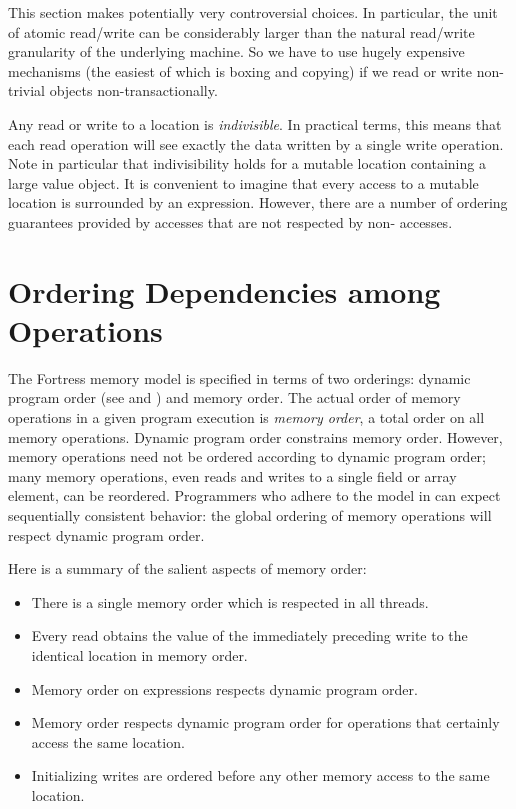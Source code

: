 This section makes potentially very controversial choices.  In
particular, the unit of atomic read/write can be considerably larger
than the natural read/write granularity of the underlying machine.
So we have to use hugely expensive mechanisms (the easiest of which
is boxing and copying) if we read or write non-trivial objects
non-transactionally.


Any read or write to a location is
\emph{indivisible}.  In practical terms, this means that each read
operation will see exactly the data written by a single write
operation.  Note in particular that indivisibility holds for a mutable
location containing a large value object.  It is convenient to imagine
that every access to a mutable location is surrounded by an
 expression.  However, there are a number of ordering
guarantees provided by  accesses that are not respected by
non- accesses.

\section{Ordering Dependencies among Operations}

The Fortress memory model is specified in terms of two orderings:
dynamic program order (see  and
) and memory order.  The actual order of memory
operations in a given program execution is \emph{memory order}, a
total order on all memory operations.  Dynamic program order
constrains memory order.  However, memory operations need not be
ordered according to dynamic program order; many memory operations,
even reads and writes to a single field or array element, can be
reordered.  Programmers who adhere to the model in
 can expect sequentially consistent
behavior: the global ordering of memory operations will respect dynamic program order.

Here is a summary of the salient aspects of memory order:
\begin{itemize}
\item There is a single memory order which is respected in all threads.
\item Every read obtains the value of the immediately preceding write
  to the identical location in memory order.
\item Memory order on  expressions respects dynamic program order.
\item Memory order respects dynamic program order for operations that
  certainly access the same location.
\item Initializing writes are ordered before any other memory access
  to the same location.
\end{itemize}

